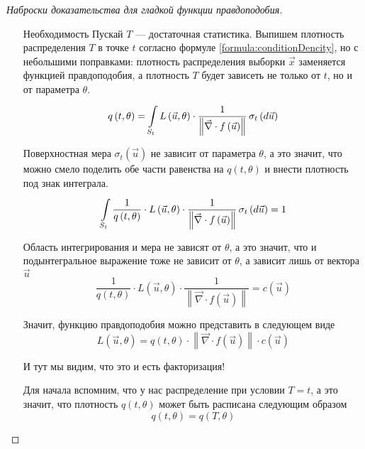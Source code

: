 \begin{proof}[Наброски доказательства для гладкой функции правдоподобия]
\begin{enumerate}
            Условное распределение $\vec{x}$ не зависит от $\theta$
            при известном $T$, что и требовалось доказать для того, чтобы
            показать достаточность факторизации.

        \item[Необходимость]
            Пускай $T$ --- достаточная статистика.
            Выпишем плотность распределения $T$ в точке $t$ согласно формуле
            \eqref{formula:conditionDencity}, но с небольшими поправками:
            плотность распределения выборки $\vec{x}$ заменяется
            функцией правдоподобия, а плотность $T$ будет зависеть не только
            от $t$, но и от параметра $\theta$.
            $$q\left( t, \theta \right)
                = \integrall{S_t}{\sigma_{t}\left(d\vec{u} \right)}{
                    L\left( \vec{u}, \theta \right) \cdot \frac{1}{
                        \left\| \vec{\nabla}
                            \cdot f\left( \vec{u} \right) \right\|}}$$

            Поверхностная мера $\sigma_{t} \left( \vec{u} \right)$ не зависит
            от параметра $\theta$, а это значит, что можно смело поделить
            обе части равенства на $q\left( t, \theta \right)$ и внести
            плотность под знак интеграла.
            $$\integrall{S_t}{\sigma_{t}\left(d\vec{u} \right)}{
                \frac{1}{q\left( t, \theta \right)}
                \cdot L\left( \vec{u}, \theta \right) \cdot \frac{1}{
                    \left\| \vec{\nabla}
                        \cdot f\left( \vec{u} \right) \right\|}} = 1$$

            Область интегрирования и мера не зависят от $\theta$, а это значит,
            что и подынтегральное выражение тоже не зависит от $\theta$,
            а зависит лишь от вектора $\vec{u}$
            $$\frac{1}{q\left( t, \theta \right)}
                \cdot L\left( \vec{u}, \theta \right) \cdot \frac{1}{
                    \left\| \vec{\nabla} \cdot f\left( \vec{u} \right) \right\|}
                = c\left( \vec{u} \right)$$

            Значит, функцию правдоподобия можно представить в следующем виде
            $$L\left( \vec{u}, \theta \right)
                = q\left( t, \theta \right)
                    \cdot \left\| \vec{\nabla}
                        \cdot f\left( \vec{u} \right) \right\|
                        \cdot c\left( \vec{u} \right)$$

            И тут мы видим, что это и есть факторизация!

            Для начала вспомним, что у нас распределение при условии $T=t$,
            а это значит, что плотность $q\left( t, \theta \right)$
            может быть расписана следующим образом
            $$q\left( t, \theta \right)
                = q\left( T, \theta \right)$$


\end{enumerate}
\end{proof}
